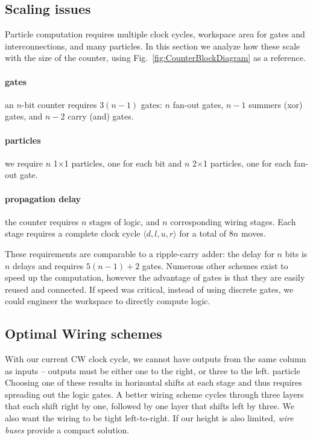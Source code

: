 \documentclass[letterpaper, 10 pt, conference]{ieeeconf}
\begin{document}
\subsection{Scaling issues}
 Particle computation requires multiple clock cycles, workspace area for gates and interconnections, and many particles.  In this section we analyze how these scale with the size of the counter, using Fig.~\ref{fig:CounterBlockDiagram} as a reference.   


\paragraph{gates}  an $n$-bit counter requires $3(n-1)$ gates: $n$ {\sc fan-out} gates, $n-1$ summers ({\sc xor}) gates, and $n-2$ carry ({\sc and}) gates. 
\paragraph{particles} we require $n$ 1$\times$1 particles, one for each bit and $n$ 2$\times$1 particles, one for each {\sc fan-out} gate.
\paragraph{ propagation delay} the counter requires $n$ stages of logic, and $n$ corresponding wiring stages.  Each stage requires a complete clock cycle $\langle d,l,u,r \rangle$ for a total of 8$n$ moves.

These requirements are comparable to a ripple-carry adder:  the delay for $n$ bits is $n$ delays  and requires $5(n-1)+2$ gates.
Numerous other schemes exist to speed up the computation, however the advantage of gates is that they are easily reused and connected.  If speed was critical, instead of using discrete gates, we could engineer the workspace to directly compute logic.  

\subsection{Optimal Wiring schemes}\label{sec:wiring}
With our current CW clock cycle, we cannot have outputs from the same column as
inputs -- outputs must be either one to the right, or three to the left. particle 
Choosing one of these results in horizontal shifts at each stage and thus
requires spreading out the logic gates. A better wiring scheme cycles
through three layers that each shift right by one, followed by one layer that
shifts left by three.  We also want the wiring to be tight left-to-right.  If our
height is also limited, \emph{wire buses} provide a compact solution. 
\end{document}
